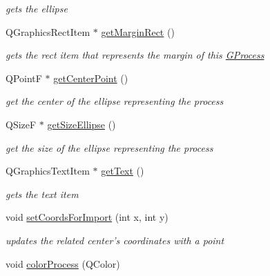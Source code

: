 \begin{DoxyCompactItemize}
\begin{DoxyCompactList}\small\item\em gets the ellipse \end{DoxyCompactList}\item 
\hypertarget{classGProcess_a2f5c5c661ace7a5f3499c7ddf1669018}{Q\+Graphics\+Rect\+Item $\ast$ \hyperlink{classGProcess_a2f5c5c661ace7a5f3499c7ddf1669018}{get\+Margin\+Rect} ()}\label{classGProcess_a2f5c5c661ace7a5f3499c7ddf1669018}

\begin{DoxyCompactList}\small\item\em gets the rect item that represents the margin of this \hyperlink{classGProcess}{G\+Process} \end{DoxyCompactList}\item 
Q\+Point\+F $\ast$ \hyperlink{classGProcess_af4bb806fa496a07b8996d51a400797a3}{get\+Center\+Point} ()
\begin{DoxyCompactList}\small\item\em get the center of the ellipse representing the process \end{DoxyCompactList}\item 
Q\+Size\+F $\ast$ \hyperlink{classGProcess_ac5d93bdd3fd14ec276453d0578cda3b8}{get\+Size\+Ellipse} ()
\begin{DoxyCompactList}\small\item\em get the size of the ellipse representing the process \end{DoxyCompactList}\item 
\hypertarget{classGProcess_a78a16fd604b953bbfeb6a8aba5ed8712}{Q\+Graphics\+Text\+Item $\ast$ \hyperlink{classGProcess_a78a16fd604b953bbfeb6a8aba5ed8712}{get\+Text} ()}\label{classGProcess_a78a16fd604b953bbfeb6a8aba5ed8712}

\begin{DoxyCompactList}\small\item\em gets the text item \end{DoxyCompactList}\item 
void \hyperlink{classGProcess_a1bb677682c51f3e329d58eaa7646ae5e}{set\+Coords\+For\+Import} (int x, int y)
\begin{DoxyCompactList}\small\item\em updates the related center's coordinates with a point \end{DoxyCompactList}\item 
\hypertarget{classGProcess_a3e8049a240d5781916b4c4d71af01b40}{void \hyperlink{classGProcess_a3e8049a240d5781916b4c4d71af01b40}{color\+Process} (Q\+Color)}\label{classGProcess_a3e8049a240d5781916b4c4d71af01b40}


\end{DoxyCompactItemize}
